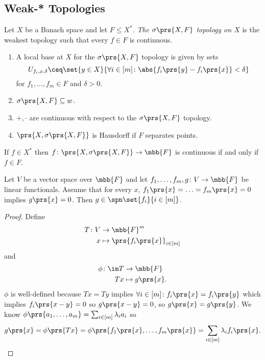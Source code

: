 \documentclass[10pt, twoside]{book}
\begin{document}
\subsection{Weak-* Topologies}

\begin{definition}
Let $X$ be a Banach space and let $F \leq X^*$. \emph{The $\sigma\prs{X,F}$ topology on $X$} is the weakest topology such that every $f \in F$ is continuous.
\end{definition}

\begin{proposition}
\begin{enumerate}
\item A local base at $X$ for the $\sigma\prs{X, F}$ topology is given by sets
\[U_{f_i, x, \delta} \ceq \set{y \in X}{\forall i \in [m] \colon \abs{f_i\prs{y} - f_i\prs{x}} < \delta}\]
for $f_1, \ldots, f_m \in F$ and $\delta > 0$.
\item $\sigma\prs{X,F} \subseteq w$.
\item $+,\cdot$ are continuous with respect to the $\sigma\prs{X,F}$ topology.
\item $\prs{X, \sigma\prs{X,F}}$ is Hausdorff if $F$ separates points.
\end{enumerate}
\end{proposition}

\begin{proposition}
If $f \in X^*$ then $f \colon \prs{X, \sigma\prs{X,F}} \to \mbb{F}$ is continuous if and only if $f \in F$.
\end{proposition}

\begin{lemma}
Let $V$ be a vector space over $\mbb{F}$ and let $f_1, \ldots, f_m, g \colon V \to \mbb{F}$ be linear functionals. Assume that for every $x$, $f_1\prs{x} = \ldots = f_m\prs{x} = 0$ implies $g\prs{x} = 0$.
Then $g \in \spn\set{f_i}{i \in [m]}$.
\end{lemma}

\begin{proof}
Define
\begin{align*}
T \colon V &\to \mbb{F}^m \\
x &\mapsto \prs{f_i\prs{x}}_{i \in [m]}
\end{align*}
and
\begin{align*}
\phi \colon \im T &\to \mbb{F} \\
Tx &\mapsto g\prs{x} \text{.}
\end{align*}
$\phi$ is well-defined because $Tx = Ty$ implies $\forall i \in [m] \colon f_i\prs{x} = f_i\prs{y}$ which implies $f_i\prs{x-y} = 0$ so $g\prs{x-y} = 0$, so $g\prs{x} = g\prs{y}$.
We know $\phi\prs{a_1,\ldots,a_m} = \sum_{i \in [m]} \lambda_i a_i$ so
\[g\prs{x} = \phi\prs{Tx} = \phi\prs{f_1\prs{x},\ldots,f_m\prs{x}} = \sum_{i \in [m]} \lambda_i f_i\prs{x} \text{.}\]
\end{proof}
\end{document}
